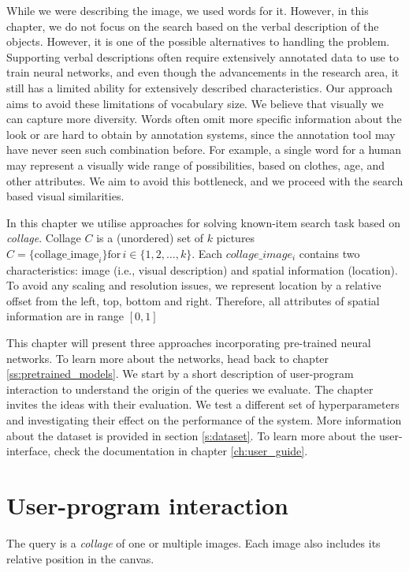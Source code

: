 While we were describing the image, we used words for it. However, in this chapter, we do not focus on the search based on the verbal description of the objects. However, it is one of the possible alternatives to handling the problem. Supporting verbal descriptions often require extensively annotated data to use to train neural networks, and even though the advancements in the research area, it still has a limited ability for extensively described characteristics. Our approach aims to avoid these limitations of vocabulary size. We believe that visually we can capture more diversity. Words often omit more specific information about the look or are hard to obtain by annotation systems, since the annotation tool may have never seen such combination before. For example, a single word for a human may represent a visually wide range of possibilities, based on clothes, age, and other attributes. We aim to avoid this bottleneck, and we proceed with the search based visual similarities.


In this chapter we utilise approaches for solving known-item search task based on \emph{collage}. Collage $C$ is a (unordered) set of $k$ pictures $C = \{\text{collage\_image}_i\} \text{for}\, i \in \{1, 2, \dots, k\} $.  Each $collage\_image_i$ contains two characteristics: image (i.e., visual description) and spatial information (location). To avoid any scaling and resolution issues, we represent location by a relative offset from the left, top, bottom and right. Therefore, all attributes of spatial information are in range $[0,1]$

This chapter will present three approaches incorporating pre-trained neural networks. To learn more about the networks, head back to chapter \ref{ss:pretrained_models}. We start by a short description of user-program interaction to understand the origin of the queries we evaluate. The chapter invites the ideas with their evaluation. We test a different set of hyperparameters and investigating their effect on the performance of the system. More information about the dataset is provided in section \ref{s:dataset}. To learn more about the user-interface, check the documentation in chapter \ref{ch:user_guide}. 


\section{User-program interaction}

The query is a \emph{collage} of one or multiple images. Each image also includes its relative position in the canvas.

